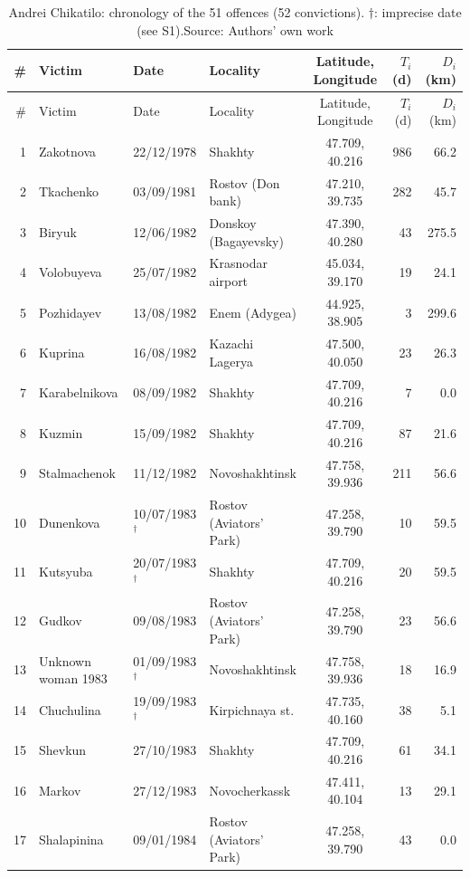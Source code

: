 \documentclass[11pt,a4paper]{article}
\begin{document}
{\small
\begin{longtable}{rllp{3.6cm}crr}
\caption{Andrei Chikatilo: chronology of the 51 offences (52 convictions). $\dagger$: imprecise date (see S1).\newline Source: Authors' own work}\\
\toprule
\# & Victim & Date & Locality & Latitude, Longitude & $T_i$ (d) & $D_i$ (km)\\
\midrule
\endfirsthead
\toprule
\# & Victim & Date & Locality & Latitude, Longitude & $T_i$ (d) & $D_i$ (km)\\
\midrule
\endhead
1 & Zakotnova & 22/12/1978 & Shakhty & 47.709, 40.216 & 986 & 66.2\\
2 & Tkachenko & 03/09/1981 & Rostov (Don bank) & 47.210, 39.735 & 282 & 45.7\\
3 & Biryuk & 12/06/1982 & Donskoy (Bagayevsky) & 47.390, 40.280 & 43 & 275.5\\
4 & Volobuyeva & 25/07/1982 & Krasnodar airport & 45.034, 39.170 & 19 & 24.1\\
5 & Pozhidayev & 13/08/1982 & Enem (Adygea) & 44.925, 38.905 & 3 & 299.6\\
6 & Kuprina & 16/08/1982 & Kazachi Lagerya & 47.500, 40.050 & 23 & 26.3\\
7 & Karabelnikova & 08/09/1982 & Shakhty & 47.709, 40.216 & 7 & 0.0\\
8 & Kuzmin & 15/09/1982 & Shakhty & 47.709, 40.216 & 87 & 21.6\\
9 & Stalmachenok & 11/12/1982 & Novoshakhtinsk & 47.758, 39.936 & 211 & 56.6\\
10 & Dunenkova & 10/07/1983$^\dagger$ & Rostov (Aviators' Park) & 47.258, 39.790 & 10 & 59.5\\
11 & Kutsyuba & 20/07/1983$^\dagger$ & Shakhty & 47.709, 40.216 & 20 & 59.5\\
12 & Gudkov & 09/08/1983 & Rostov (Aviators' Park) & 47.258, 39.790 & 23 & 56.6\\
13 & Unknown woman 1983 & 01/09/1983$^\dagger$ & Novoshakhtinsk & 47.758, 39.936 & 18 & 16.9\\
14 & Chuchulina & 19/09/1983$^\dagger$ & Kirpichnaya st. & 47.735, 40.160 & 38 & 5.1\\
15 & Shevkun & 27/10/1983 & Shakhty & 47.709, 40.216 & 61 & 34.1\\
16 & Markov & 27/12/1983 & Novocherkassk & 47.411, 40.104 & 13 & 29.1\\
17 & Shalapinina & 09/01/1984 & Rostov (Aviators' Park) & 47.258, 39.790 & 43 & 0.0\\

\end{longtable}}
\end{document}
